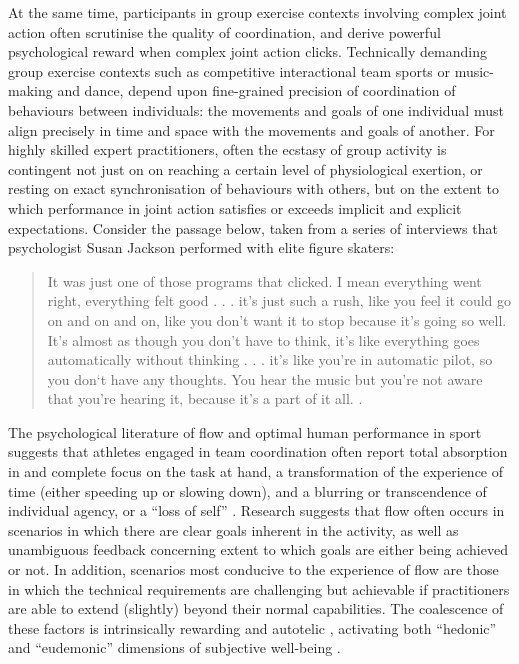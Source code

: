 \begin{CJK}{UTF8}{gbsn}
At the same time, participants in group exercise contexts involving complex joint action often scrutinise the quality of coordination, and derive powerful psychological reward when complex joint action clicks.  Technically demanding group exercise contexts such as competitive interactional team sports or music-making and dance, depend upon fine-grained precision of coordination of behaviours between individuals: the movements and goals of one individual must align precisely in time and space with the movements and goals of another.  For highly skilled expert practitioners, often the ecstasy of group activity is contingent not just on on reaching a certain level of physiological exertion, or resting on exact synchronisation of behaviours with others, but on the extent to which performance in joint action satisfies or exceeds implicit and explicit expectations.  Consider the passage below, taken from a series of interviews that psychologist Susan Jackson performed with elite figure skaters:
  \begin{quotation}
    It was just one of those programs that clicked. I mean everything went right, everything felt good . . . it's just such a rush, like you feel it could go on and on and on, like you don't want it to stop because it's going so well.  It's almost as though you don't have to think, it's like everything goes automatically without thinking . . . it's like you're in automatic pilot, so you don‘t have any thoughts.  You hear the music but you're not aware that you're hearing it, because it's a part of it all. \citep[168]{Jackson1992}.
  \end{quotation}

The psychological literature of flow and optimal human performance in sport suggests that athletes engaged in team coordination often report total absorption in and complete focus on the task at hand, a transformation of the experience of time (either speeding up or slowing down), and a blurring or transcendence of individual agency, or a ``loss of self''   \citep{Csikszentmihalyi1992,Jackson1995,Jackson1999,McNeill1995}.  Research suggests that flow often occurs in scenarios in which there are clear goals inherent in the activity, as well as unambiguous feedback concerning extent to which goals are either being achieved or not.  In addition, scenarios most conducive to the experience of flow are those in which the technical requirements are challenging but achievable if practitioners are able to extend (slightly) beyond their normal capabilities\citep{Fong2015}.  The coalescence of these factors is intrinsically rewarding and autotelic \citep{Csikszentmihalyi1975}, activating both ``hedonic'' and ``eudemonic'' dimensions of subjective well-being \citep{Huta2010,Fave2009}.


\end{CJK}
